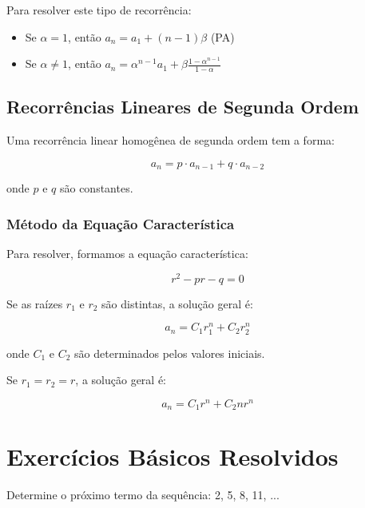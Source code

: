 \documentclass[12pt,a4paper]{article}
\begin{document}
Para resolver este tipo de recorrência:

\begin{itemize}
    \item Se $\alpha = 1$, então $a_n = a_1 + (n-1)\beta$ (PA)
    \item Se $\alpha \neq 1$, então $a_n = \alpha^{n-1}a_1 + \beta\frac{1-\alpha^{n-1}}{1-\alpha}$
\end{itemize}

\subsection{Recorrências Lineares de Segunda Ordem}

Uma recorrência linear homogênea de segunda ordem tem a forma:

\begin{equation}
a_n = p \cdot a_{n-1} + q \cdot a_{n-2}
\end{equation}

onde $p$ e $q$ são constantes.

\subsubsection{Método da Equação Característica}

Para resolver, formamos a equação característica:

\begin{equation}
r^2 - pr - q = 0
\end{equation}

Se as raízes $r_1$ e $r_2$ são distintas, a solução geral é:

\begin{equation}
a_n = C_1 r_1^n + C_2 r_2^n
\end{equation}

onde $C_1$ e $C_2$ são determinados pelos valores iniciais.

Se $r_1 = r_2 = r$, a solução geral é:

\begin{equation}
a_n = C_1 r^n + C_2 n r^n
\end{equation}

\section{Exercícios Básicos Resolvidos}

\begin{tcolorbox}[colback=blue!5!white,colframe=blue!75!black,title=Exercício B1]
Determine o próximo termo da sequência: 2, 5, 8, 11, ...
\end{tcolorbox}
\end{document}
